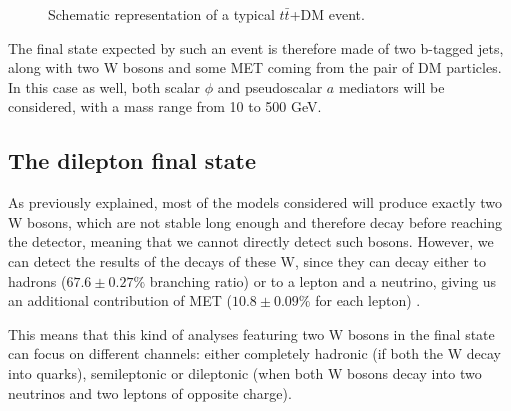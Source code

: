\documentclass[a4paper, 10pt, openright]{report}
\begin{document}
\begin{figure}[htbp]
\begin{center}
\caption{Schematic representation of a typical $t \bar t$+DM event.}
\label{fig:ttDMFeynman}
\end{center}
\end{figure}

The final state expected by such an event is therefore made of two b-tagged jets, along with two W bosons and some \ac{MET} coming from the pair of \ac{DM} particles. In this case as well, both scalar $\phi$ and pseudoscalar $a$ mediators will be considered, with a mass range from 10 to 500 GeV.

\subsection{The dilepton final state} \label{subsection:diLeptonFS}

As previously explained, most of the models considered will produce exactly two W bosons, which are not stable long enough and therefore decay before reaching the detector, meaning that we cannot directly detect such bosons. However, we can detect the results of the decays of these W, since they can decay either to hadrons ($67.6 \pm 0.27 \%$ branching ratio) or to a lepton and a neutrino, giving us an additional contribution of \ac{MET} ($10.8 \pm 0.09 \%$ for each lepton) \cite{PDG}.

This means that this kind of analyses featuring two W bosons in the final state can focus on different channels: either completely hadronic (if both the W decay into quarks), semileptonic or dileptonic (when both W bosons decay into two neutrinos and two leptons of opposite charge). 
\end{document}
